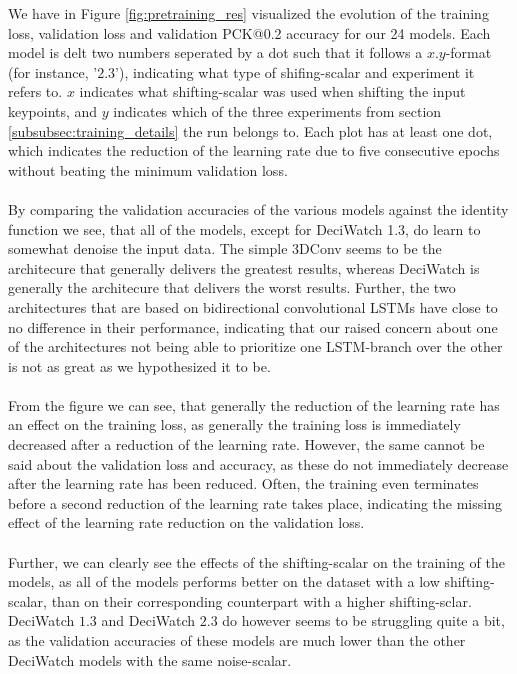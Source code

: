 \documentclass[./main.tex]{subfiles}
\begin{document}
We have in Figure \ref{fig:pretraining_res} visualized the evolution of the training loss, validation loss and validation PCK@0.2 accuracy for our 24 models. Each model is delt two numbers seperated by a dot such that it follows a $x.y$-format (for instance, '$2.3$'), indicating what type of shifing-scalar and experiment it refers to. $x$ indicates what shifting-scalar was used when shifting the input keypoints, and $y$ indicates which of the three experiments from section \ref{subsubsec:training_details} the run belongs to. Each plot has at least one dot, which indicates the reduction of the learning rate due to five consecutive epochs without beating the minimum validation loss.
\\
\\
By comparing the validation accuracies of the various models against the identity function we see, that all of the models, except for DeciWatch 1.3, do learn to somewhat denoise the input data. The simple 3DConv seems to be the architecure that generally delivers the greatest results, whereas DeciWatch is generally the architecure that delivers the worst results. Further, the two architectures that are based on bidirectional convolutional LSTMs have close to no difference in their performance, indicating that our raised concern about one of the architectures not being able to prioritize one LSTM-branch over the other is not as great as we hypothesized it to be.
\\
\\
From the figure we can see, that generally the reduction of the learning rate has an effect on the training loss, as generally the training loss is immediately decreased after a reduction of the learning rate. However, the same cannot be said about the validation loss and accuracy, as these do not immediately decrease after the learning rate has been reduced. Often, the training even terminates before a second reduction of the learning rate takes place, indicating the missing effect of the learning rate reduction on the validation loss.
\\
\\
Further, we can clearly see the effects of the shifting-scalar on the training of the models, as all of the models performs better on the dataset with a low shifting-scalar, than on their corresponding counterpart with a higher shifting-sclar. DeciWatch $1.3$ and DeciWatch $2.3$ do however seems to be struggling quite a bit, as the validation accuracies of these models are much lower than the other DeciWatch models with the same noise-scalar.
\end{document}
